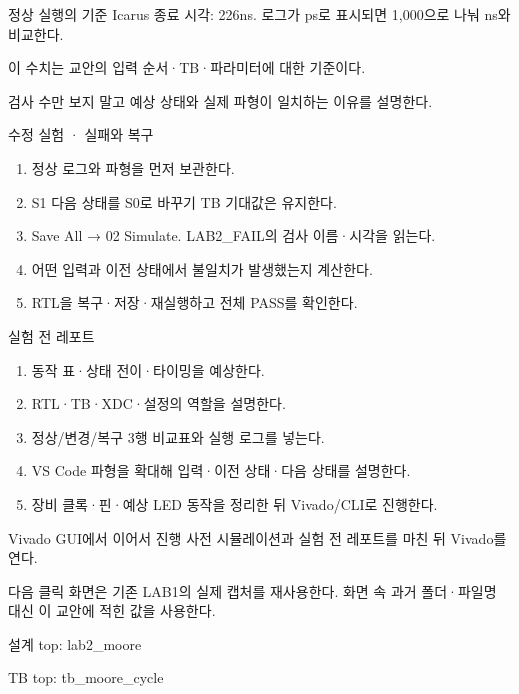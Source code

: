 \begin{frame}{정상 실행의 기준}
\small
{}Icarus 종료 시각: 226ns. 로그가 ps로 표시되면 1,000으로 나눠 ns와 비교한다.\par\vspace{0.26cm}이 수치는 교안의 입력 순서·TB·파라미터에 대한 기준이다.\par\vspace{0.26cm}검사 수만 보지 말고 예상 상태와 실제 파형이 일치하는 이유를 설명한다.\par
\end{frame}

\begin{frame}{수정 실험 · 실패와 복구}
\small
\begin{enumerate}
\item 정상 로그와 파형을 먼저 보관한다.
\item S1 다음 상태를 S0로 바꾸기 TB 기대값은 유지한다.
\item Save All → 02 Simulate. LAB2\_FAIL의 검사 이름·시각을 읽는다.
\item 어떤 입력과 이전 상태에서 불일치가 발생했는지 계산한다.
\item RTL을 복구·저장·재실행하고 전체 PASS를 확인한다.
\end{enumerate}
\end{frame}

\begin{frame}[label=reports]{실험 전 레포트}
\small
\begin{enumerate}
\item 동작 표·상태 전이·타이밍을 예상한다.
\item RTL·TB·XDC·설정의 역할을 설명한다.
\item 정상/변경/복구 3행 비교표와 실행 로그를 넣는다.
\item VS Code 파형을 확대해 입력·이전 상태·다음 상태를 설명한다.
\item 장비 클록·핀·예상 LED 동작을 정리한 뒤 Vivado/CLI로 진행한다.
\end{enumerate}
\end{frame}

\begin{frame}[label=implementation]{Vivado GUI에서 이어서 진행}
\small
사전 시뮬레이션과 실험 전 레포트를 마친 뒤 Vivado를 연다.\par\vspace{0.26cm}다음 클릭 화면은 기존 LAB1의 실제 캡처를 재사용한다. 화면 속 과거 폴더·파일명 대신 이 교안에 적힌 값을 사용한다.\par\vspace{0.26cm}설계 top: lab2\_moore\par\vspace{0.26cm}TB top: tb\_moore\_cycle\par
\end{frame}

